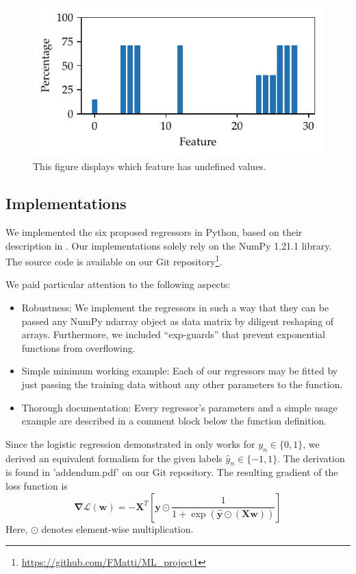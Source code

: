 \documentclass[11pt, a4paper, twocolumn]{article}
\begin{document}
\begin{figure}[htp]
    \centering
    \includegraphics[width=\columnwidth]{figures/undefined_values.pdf}
    \caption{This figure displays which feature has undefined values.}
    \label{fig:undefined_values_per_feature}
\end{figure}

\subsection{Implementations}
\label{subsec:implementations}

We implemented the six proposed regressors in Python, based on their description
in \cite{jaggi2021}. Our implementations solely rely on the NumPy 1.21.1 library.
The source code is available on our Git repository\footnote{\url{https://github.com/FMatti/ML_project1}}.

We paid particular attention to the following aspects:

\begin{itemize}
    \item Robustness: We implement the regressors in such a way that they can
          be passed any NumPy ndarray object as data matrix by diligent reshaping
          of arrays. Furthermore, we included \enquote{exp-guards} that prevent exponential 
          functions from overflowing.
    \item Simple minimum working example: Each of our regressors may be fitted by 
          just passing the training data without any other parameters to the function.
    \item Thorough documentation: Every regressor's parameters and a simple usage
          example are described in a comment block below the function definition.
\end{itemize}

Since the logistic regression demonstrated in \cite{jaggi2021} only works for
$y_n \in \{0, 1\}$, we derived an equivalent formalism for the given labels
$\hat{y}_n \in \{-1, 1\}$. The derivation is found in 'addendum.pdf'
on our Git repository. The
resulting gradient of the loss function is
\begin{equation}
    \boldsymbol{\nabla} \mathcal{L}(\boldsymbol{w})
     = - \boldsymbol{X}^T \left[ \boldsymbol{y} \odot \frac{1}
        {1 + \exp{(\hat{\boldsymbol{y}} \odot (\boldsymbol{X} \boldsymbol{w}))}} \right]
\end{equation}
Here, $\odot$ denotes element-wise multiplication.
\end{document}
